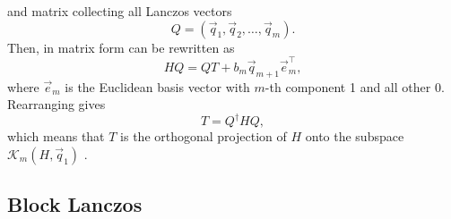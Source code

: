 and matrix collecting all Lanczos vectors
\begin{equation}
    Q = (\vec{q}_1, \vec{q}_2, \ldots, \vec{q}_m).
\end{equation}
Then,  in matrix form can be rewritten as
\begin{equation}
    H Q = Q T + b_{m}\vec{q}_{m+1}\vec{e}_{m}^\top,
\end{equation}
where $\vec{e}_m$ is the Euclidean basis vector with $m$-th component 1 and all other 0.
Rearranging gives
\begin{equation}
    T = Q^\dag H Q,
\end{equation}
which means that $T$ is the orthogonal projection of $H$ onto
the subspace $\mathcal{K}_m(H, \vec{q}_1)$ \cite{Cullum1985}.

\subsection{Block Lanczos}

